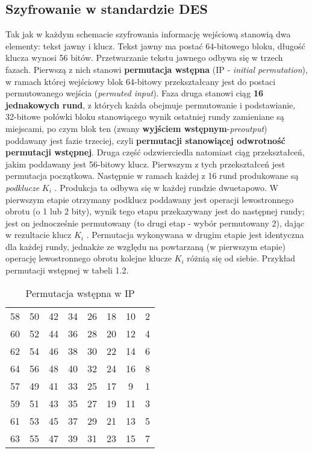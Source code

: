 \documentclass[12pt, a4paper,titlepage]{article}
\begin{document}
\subsection{Szyfrowanie w standardzie DES}
Tak jak w każdym schemacie szyfrowania informację wejściową stanowią dwa elementy: tekst
jawny i klucz. Tekst jawny ma postać 64-bitowego bloku, długość klucza wynosi 56 bitów.
Przetwarzanie tekstu jawnego odbywa się w trzech fazach. Pierwszą z nich stanowi \textbf{permutacja wstępna} (IP - \textit{initial permutation}), w ramach której wejściowy blok 64-bitowy
przekształcany jest do postaci permutowanego wejścia (\textit{permuted input}). Faza druga stanowi ciąg \textbf{16 jednakowych rund}, z których każda obejmuje permutowanie i podstawianie,
32-bitowe połówki bloku stanowiącego wynik ostatniej rundy zamieniane są miejscami, po
czym blok ten (zwany \textbf{wyjściem wstępnym}-\textit{preoutput}) poddawany jest fazie trzeciej, czyli
\textbf{permutacji stanowiącej odwrotność permutacji wstępnej}.
\newline
\newline
Druga część odzwierciedla natomiast ciąg przekształceń, jakim poddawany jest 56-bitowy klucz. Pierwszym z tych przekształceń jest permutacja początkowa. Następnie w ramach każdej z 16 rund produkowane są \textit{podklucze} $K_i$ . Produkcja ta odbywa się w każdej rundzie dwuetapowo. W pierwszym etapie otrzymany podklucz poddawany jest operacji lewostronnego obrotu (o 1 lub 2 bity), wynik tego etapu przekazywany jest do następnej rundy; jest on jednocześnie permutowany (to drugi etap - wybór permutowany 2), dając w rezultacie klucz $K_i$ . Permutacja wykonywana w drugim etapie jest identyczna dla każdej rundy, jednakże ze względu na powtarzaną (w pierwszym etapie) operację lewostronnego obrotu kolejne klucze $K_i$ różnią się od siebie.
\newline
\newline
Przykład permutacji wstępnej w tabeli 1.2.
\begin{table}[h]
\centering\caption{Permutacja wstępna w IP}
\begin{tabular}{|cccccccc|}
\hline
58 & 50 & 42 & 34 & 26 & 18 & 10 & 2\\
60 & 52 & 44 & 36 & 28 & 20 & 12 & 4\\
62 & 54 & 46 & 38 & 30 & 22 & 14 & 6\\
64 & 56 & 48 & 40 & 32 & 24 & 16 & 8\\
57 & 49 & 41 & 33 & 25 & 17 & 9 & 1\\
59 & 51 & 43 & 35 & 27 & 19 & 11 & 3\\
61 & 53 & 45 & 37 & 29 & 21 & 13 & 5\\
63 & 55 & 47 & 39 & 31 & 23 & 15 & 7\\
\hline
\end{tabular}
\end{table}
\end{document}
